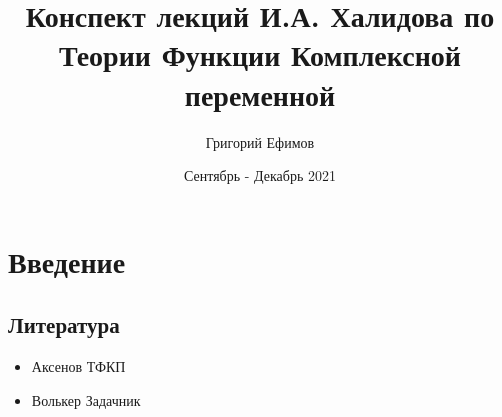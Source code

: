 \documentclass{article}
\title{Конспект лекций И.А. Халидова по Теории Функции Комплексной переменной}
\author{Григорий Ефимов}
\date{Сентябрь - Декабрь 2021}
\begin{document}
    \begin{titlepage}
      \maketitle
    \end{titlepage}
    \tableofcontents
    \newpage
    \section{Введение}
        \subsection{Литература}
            \begin{itemize}
                \item Аксенов ТФКП
                \item Волькер Задачник
            \end{itemize}
            \newpage
\end{document}
